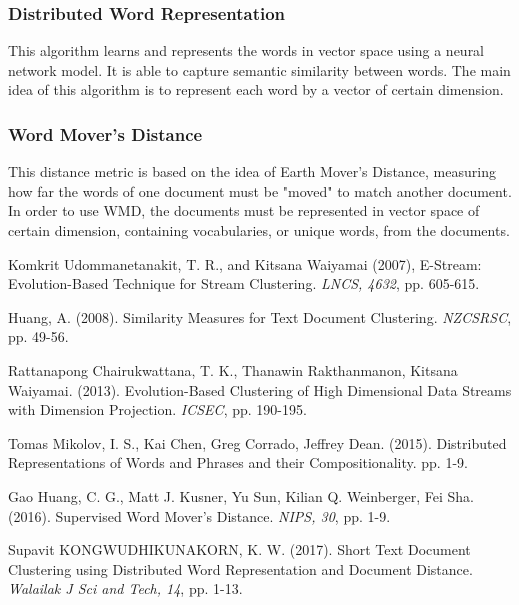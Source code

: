 \documentclass{IEEEtran}
\begin{document}
\subsubsection{Distributed Word Representation}
This algorithm learns and represents the words in vector space using a neural network model. It is able to capture semantic similarity between words. The main idea of this algorithm is to represent each word by a vector of certain dimension.

\subsubsection{Word Mover's Distance}
This distance metric is based on the idea of Earth Mover's Distance, measuring how far the words of one document must be "moved" to match another document. In order to use WMD, the documents must be represented in vector space of certain dimension, containing vocabularies, or unique words, from the documents.

\begin{thebibliography}{99}
 Komkrit Udommanetanakit, T. R., and Kitsana Waiyamai (2007), E-Stream: Evolution-Based Technique for Stream Clustering. {\it  LNCS, 4632},  pp. 605-615.

 Huang, A. (2008). Similarity Measures for Text Document Clustering. {\it NZCSRSC}, pp. 49-56. 
 
 Rattanapong Chairukwattana, T. K., Thanawin Rakthanmanon, Kitsana Waiyamai. (2013). Evolution-Based Clustering of High Dimensional Data Streams with Dimension Projection. {\it ICSEC}, pp. 190-195. 
  
 Tomas Mikolov, I. S., Kai Chen, Greg Corrado, Jeffrey Dean. (2015). Distributed Representations of Words and Phrases and their Compositionality. pp. 1-9.
  
 Gao Huang, C. G., Matt J. Kusner, Yu Sun, Kilian Q. Weinberger, Fei Sha. (2016). Supervised Word Mover's Distance. {\it NIPS, 30}, pp. 1-9. 
  
 Supavit KONGWUDHIKUNAKORN, K. W. (2017). Short Text Document Clustering using Distributed Word Representation and Document Distance. {\it  Walailak J Sci and Tech, 14}, pp. 1-13. 
    
\end{thebibliography}
\end{document}
